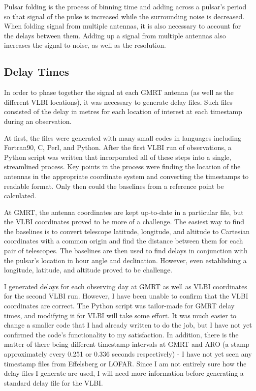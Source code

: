 \documentclass[a4paper,12pt]{article}
\begin{document}
Pulsar folding is the process of binning time and adding across a pulsar’s period so that signal of the pulse is increased while the surrounding noise is decreased. When folding signal from multiple antennas, it is also necessary to account for the delays between them. Adding up a signal from multiple antennas also increases the signal to noise, as well as the resolution.

\subsection{Delay Times}
\label{sec:delaytimes}

In order to phase together the signal at each GMRT antenna (as well as the different VLBI locations), it was necessary to generate delay files. Such files consisted of the delay in metres for each location of interest at each timestamp during an observation.

At first, the files were generated with many small codes in languages including Fortran90, C, Perl, and Python. After the first VLBI run of observations, a Python script was written that incorporated all of these steps into a single, streamlined process. Key points in the process were finding the location of the antennas in the appropriate coordinate system and converting the timestamps to readable format. Only then could the baselines from a reference point be calculated.

At GMRT, the antenna coordinates are kept up-to-date in a particular file, but the VLBI coordinates proved to be more of a challenge. The easiest way to find the baselines is to convert telescope latitude, longitude, and altitude to Cartesian coordinates with a common origin and find the distance between them for each pair of telescopes. The baselines are then used to find delays in conjunction with the pulsar's location in hour angle and declination. However, even establishing a longitude, latitude, and altitude proved to be challenge.

I generated delays for each observing day at GMRT as well as VLBI coordinates for the second VLBI run. However, I have been unable to confirm that the VLBI coordinates are correct. The Python script was tailor-made for GMRT delay times, and modifying it for VLBI will take some effort. It was much easier to change a smaller code that I had already written to do the job, but I have not yet confirmed the code's functionality to my satisfaction. In addition, there is the matter of there being different timestamp intervals at GMRT and ARO (a stamp approximately every 0.251 or 0.336 seconds respectively) - I have not yet seen any timestamp files from Effelsberg or LOFAR. Since I am not entirely sure how the delay files I generate are used, I will need more information before generating a standard delay file for the VLBI.
\end{document}
